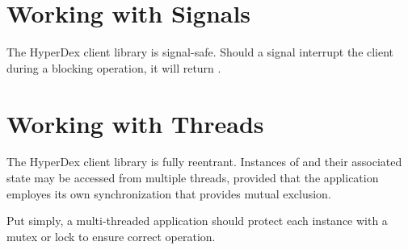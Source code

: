 
\pagebreak

\section{Working with Signals}
\label{sec:api:c:client:signals}

The HyperDex client library is signal-safe.  Should a signal interrupt the
client during a blocking operation, it will return
.

\section{Working with Threads}
\label{sec:api:c:client:threads}

The HyperDex client library is fully reentrant.  Instances of  and their associated state may be accessed from multiple
threads, provided that the application employes its own synchronization that
provides mutual exclusion.

Put simply, a multi-threaded application should protect each  instance with a mutex or lock to ensure correct operation.
